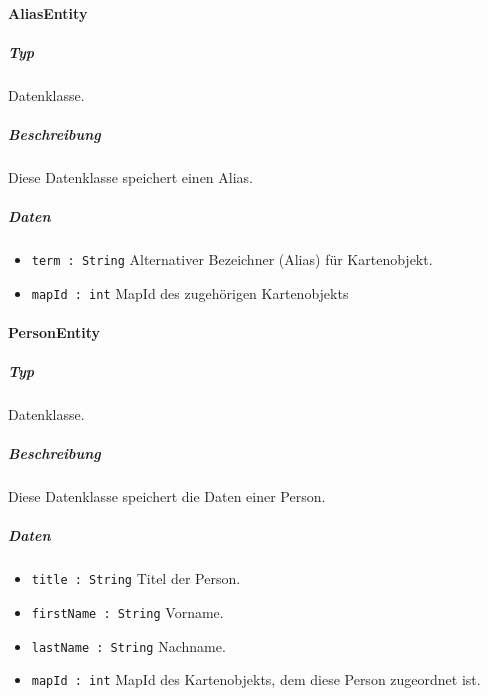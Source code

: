 \paragraph{AliasEntity}
\subparagraph*{Typ}
Datenklasse.
\subparagraph*{Beschreibung}
Diese Datenklasse speichert einen Alias.
\subparagraph*{Daten}
\begin{itemize}
    \item \texttt{term : String} Alternativer Bezeichner (Alias) für Kartenobjekt.
    \item \texttt{mapId : int} MapId des zugehörigen Kartenobjekts
\end{itemize}

\paragraph{PersonEntity}
\subparagraph*{Typ}
Datenklasse.
\subparagraph*{Beschreibung}
Diese Datenklasse speichert die Daten einer Person.
\subparagraph*{Daten}
\begin{itemize}
    \item \texttt{title : String} Titel der Person.
    \item \texttt{firstName : String} Vorname.
    \item \texttt{lastName : String} Nachname.
    \item \texttt{mapId : int} MapId des Kartenobjekts, dem diese Person zugeordnet ist.
\end{itemize}